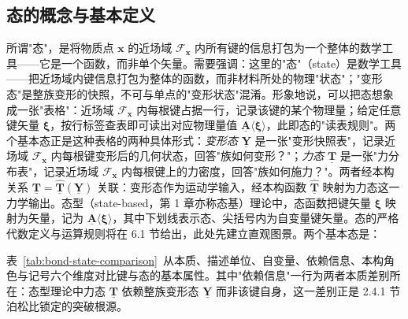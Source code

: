 \subsection{态的概念与基本定义}

所谓"态"，是将物质点 $\mathbf{x}$ 的近场域 $\mathcal{F}_{\mathbf{x}}$ 内所有键的信息打包为一个整体的数学工具——它是一个函数，而非单个矢量。需要强调：这里的"态"（state）是数学工具——把近场域内键信息打包为整体的函数，而非材料所处的物理"状态"；"变形态"是整族变形的快照，不可与单点的"变形状态"混淆。形象地说，可以把态想象成一张"表格"：近场域 $\mathcal{F}_{\mathbf{x}}$ 内每根键占据一行，记录该键的某个物理量；给定任意键矢量 $\boldsymbol{\xi}$，按行标签查表即可读出对应物理量值 $\underline{\mathbf{A}}\langle\boldsymbol{\xi}\rangle$，此即态的"读表规则"。两个基本态正是这种表格的两种具体形式：\emph{变形态} $\underline{\mathbf{Y}}$ 是一张"变形快照表"，记录近场域 $\mathcal{F}_{\mathbf{x}}$ 内每根键变形后的几何状态，回答"族如何变形？"；\emph{力态} $\underline{\mathbf{T}}$ 是一张"力分布表"，记录近场域 $\mathcal{F}_{\mathbf{x}}$ 内每根键上的力密度，回答"族如何施力？"。两者经本构关系 $\underline{\mathbf{T}}=\hat{\underline{\mathbf{T}}}(\underline{\mathbf{Y}})$ 关联：变形态作为运动学输入，经本构函数 $\hat{\underline{\mathbf{T}}}$ 映射为力态这一力学输出。态型（state-based，第 1 章亦称态基）理论中，态函数把键矢量 $\boldsymbol{\xi}$ 映射为矢量，记为 $\underline{\mathbf{A}}\langle\boldsymbol{\xi}\rangle$，其中下划线表示态、尖括号内为自变量键矢量。态的严格代数定义与运算规则将在 6.1 节给出，此处先建立直观图景。两个基本态是：

表~\ref{tab:bond-state-comparison}~从本质、描述单位、自变量、依赖信息、本构角色与记号六个维度对比键与态的基本属性。其中"依赖信息"一行为两者本质差别所在：态型理论中力态 $\underline{\mathbf{T}}$ 依赖整族变形态 $\underline{\mathbf{Y}}$ 而非该键自身，这一差别正是 2.4.1 节泊松比锁定的突破根源。

